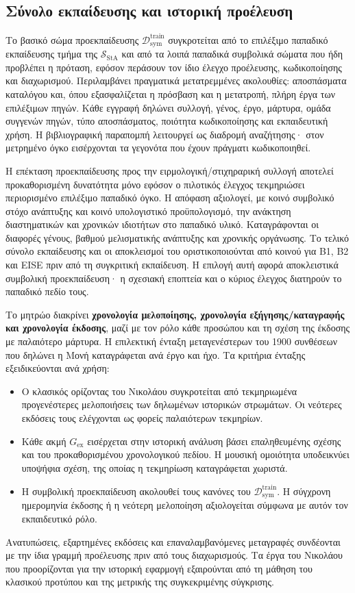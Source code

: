 \documentclass[11pt,a4paper]{article}
\begin{document}
\subsection{Σύνολο εκπαίδευσης και ιστορική προέλευση}\label{app:corpora-training}

Το βασικό σώμα προεκπαίδευσης $\mathcal D_{\mathrm{sym}}^{\mathrm{train}}$ συγκροτείται από το επιλέξιμο παπαδικό εκπαίδευσης τμήμα της $\mathcal S_{\mathrm{StA}}$ και από τα λοιπά παπαδικά συμβολικά σώματα που ήδη προβλέπει η πρόταση, εφόσον περάσουν τον ίδιο έλεγχο προέλευσης, κωδικοποίησης και διαχωρισμού. Περιλαμβάνει πραγματικά μετατρεμμένες ακολουθίες: αποσπάσματα καταλόγου και, όπου εξασφαλίζεται η πρόσβαση και η μετατροπή, πλήρη έργα των επιλέξιμων πηγών. Κάθε εγγραφή δηλώνει συλλογή, γένος, έργο, μάρτυρα, ομάδα συγγενών πηγών, τύπο αποσπάσματος, ποιότητα κωδικοποίησης και εκπαιδευτική χρήση. Η βιβλιογραφική παραπομπή λειτουργεί ως διαδρομή αναζήτησης· στον μετρημένο όγκο εισέρχονται τα γεγονότα που έχουν πράγματι κωδικοποιηθεί.

Η επέκταση προεκπαίδευσης προς την ειρμολογική/στιχηραρική συλλογή αποτελεί προκαθορισμένη δυνατότητα μόνο εφόσον ο πιλοτικός έλεγχος τεκμηριώσει περιορισμένο επιλέξιμο παπαδικό όγκο. Η απόφαση αξιολογεί, με κοινό συμβολικό στόχο ανάπτυξης και κοινό υπολογιστικό προϋπολογισμό, την ανάκτηση διαστηματικών και χρονικών ιδιοτήτων στο παπαδικό υλικό. Καταγράφονται οι διαφορές γένους, βαθμού μελισματικής ανάπτυξης και χρονικής οργάνωσης. Το τελικό σύνολο εκπαίδευσης και οι αποκλεισμοί του οριστικοποιούνται από κοινού για B1, B2 και EISE πριν από τη συγκριτική εκπαίδευση. Η επιλογή αυτή αφορά αποκλειστικά συμβολική προεκπαίδευση· η σχεσιακή εποπτεία και ο κύριος έλεγχος διατηρούν το παπαδικό πεδίο τους.

Το μητρώο διακρίνει \textbf{χρονολογία μελοποίησης, χρονολογία εξήγησης/καταγραφής και χρονολογία έκδοσης}, μαζί με τον ρόλο κάθε προσώπου και τη σχέση της έκδοσης με παλαιότερο μάρτυρα. Η επιλεκτική ένταξη μεταγενέστερων του 1900 συνθέσεων που δηλώνει η Μονή καταγράφεται ανά έργο και ήχο. Τα κριτήρια ένταξης εξειδικεύονται ανά χρήση:
\begin{itemize}
\item Ο κλασικός ορίζοντας του Νικολάου συγκροτείται από τεκμηριωμένα προγενέστερες μελοποιήσεις των δηλωμένων ιστορικών στρωμάτων. Οι νεότερες εκδόσεις τους ελέγχονται ως φορείς παλαιότερων τεκμηρίων.
\item Κάθε ακμή $G_{\mathrm{ex}}$ εισέρχεται στην ιστορική ανάλυση βάσει επαληθευμένης σχέσης και του προκαθορισμένου χρονολογικού πεδίου. Η μουσική ομοιότητα υποδεικνύει υποψήφια σχέση, της οποίας η τεκμηρίωση καταγράφεται χωριστά.
\item Η συμβολική προεκπαίδευση ακολουθεί τους κανόνες του $\mathcal D_{\mathrm{sym}}^{\mathrm{train}}$. Η σύγχρονη ημερομηνία έκδοσης ή η νεότερη μελοποίηση αξιολογείται σύμφωνα με αυτόν τον εκπαιδευτικό ρόλο.
\end{itemize}
Ανατυπώσεις, εξαρτημένες εκδόσεις και επαναλαμβανόμενες μεταγραφές συνδέονται με την ίδια γραμμή προέλευσης πριν από τους διαχωρισμούς. Τα έργα του Νικολάου που προορίζονται για την ιστορική εφαρμογή εξαιρούνται από τη μάθηση του κλασικού προτύπου και της μετρικής της συγκεκριμένης σύγκρισης.
\end{document}
